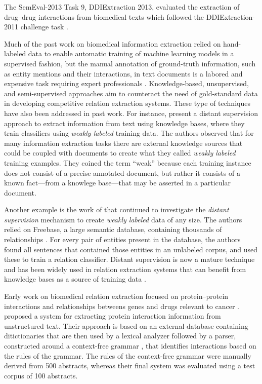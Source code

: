 The SemEval-2013 Task 9, DDIExtraction 2013, evaluated the extraction of drug--drug interactions from biomedical texts \parencite{segurabedmar2013a} which followed the DDIExtraction-2011 challenge task \parencite{segurabedmar2011b}.

Much of the past work on biomedical information extraction relied on hand-labeled data to enable automatic training of machine learning models in a supervised fashion, but the manual annotation of ground-truth information, such as entity mentions and their interactions, in text documents is a labored and expensive task requiring expert professionals \parencite{baumgartner2007a,howe2008a,winnenburg2008a,karp2016a}.
Knowledge-based, unsupervised, and semi-supervised approaches aim to counteract the need of gold-standard data in developing competitive relation extraction systems.
These type of techniques have also been addressed in past work.
For instance, \textcite{craven1999a} present a distant supervision approach to extract information from text using knowledge bases, where they train classifiers using \textit{weakly labeled} training data.
The authors observed that for many information extraction tasks there are external knowledge sources that could be coupled with documents to create what they called \textit{weakly labeled} training examples.
They coined the term ``weak'' because each training instance does not consist of a precise annotated document, but rather it consists of a known fact---from a knowlege base---that may be asserted in a particular document.

Another example is the work of \textcite{mintz2009a} that continued to investigate the \textit{distant supervision} mechanism to create \textit{weakly labeled} data  of any size.
The authors relied on Freebase, a large semantic database, containing thousands of relationships \parencite{bollacker2008a}.
For every pair of entities present in the database, the authors found all sentences that contained those entities in an unlabeled corpus, and used these to train a relation classifier.
Distant supervision is now a mature technique and has been widely used in relation extraction systems that can benefit from knowledge bases as a source of training data \parencite{smirnova2019a}.

Early work on biomedical relation extraction focused on protein--protein interactions \parencite{blaschke1999a} and relationships betweens genes and drugs relevant to cancer \parencite{rindflesch1999a}.
\textcite{temkin2003a} proposed a system for extracting protein interaction information from unstructured text.
Their approach is based on an external database containing ditictionaries that are then used by a lexical analyzer followed by a parser, constructed around a context-free grammar \parencite{chomsky1956a,aho2007a}, that identifies interactions based on the rules of the grammar.
The rules of the context-free grammar were manually derived from 500  abstracts, whereas their final system was evaluated using a test corpus of 100  abstracts.

